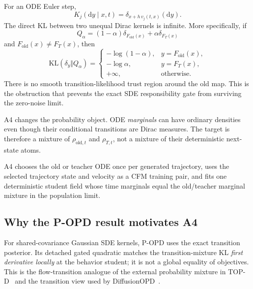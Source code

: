 \documentclass[11pt,a4paper]{article}
\newcommand{\KL}{\mathrm{KL}}
\newcommand{\dd}{\mathrm{d}}
\theoremstyle{plain}
\theoremstyle{definition}
\begin{document}
For an ODE Euler step,
\begin{equation}
K_j(\dd y\mid x,t)=\delta_{x+h\,v_j(t,x)}(\dd y).
\end{equation}
The direct KL between two unequal Dirac kernels is infinite.  More specifically, if
\begin{equation}
Q_\alpha
=(1-\alpha)\delta_{F_{\mathrm{old}}(x)}
+\alpha\delta_{F_T(x)}
\end{equation}
and $F_{\mathrm{old}}(x)\neq F_T(x)$, then
\begin{equation}
\KL(\delta_y\Vert Q_\alpha)
=
\begin{cases}
-\log(1-\alpha), & y=F_{\mathrm{old}}(x),\\
-\log\alpha, & y=F_T(x),\\
+\infty, & \text{otherwise}.
\end{cases}
\label{eq:dirac-mixture-kl}
\end{equation}
There is no smooth transition-likelihood trust region around the old map.  This is the
obstruction that prevents the exact SDE responsibility gate from surviving the zero-noise limit.

A4 changes the probability object.  ODE \emph{marginals} can have ordinary densities even though
their conditional transitions are Dirac measures.  The target is therefore a mixture of
$\rho_{\mathrm{old},t}$ and $\rho_{T,t}$, not a mixture of their deterministic next-state atoms.

\begin{tcolorbox}[colback=blue!4,colframe=blue!50!black,title=One-sentence definition]
A4 chooses the old or teacher ODE once per generated trajectory, uses the selected trajectory
state and velocity as a CFM training pair, and fits one deterministic student field whose
time marginals equal the old/teacher marginal mixture in the population limit.
\end{tcolorbox}

\subsection{Why the P-OPD result motivates A4}

For shared-covariance Gaussian SDE kernels, P-OPD uses the exact transition posterior.  Its
detached gated quadratic matches the transition-mixture KL \emph{first derivative locally} at the
behavior student; it is not a global equality of objectives.  This is the flow-transition
analogue of the external probability mixture in TOP-D~\cite{topd} and the transition view used by
DiffusionOPD~\cite{diffusionopd}.
\end{document}

